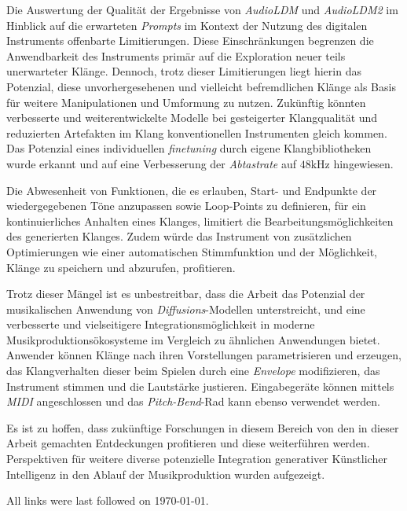 \documentclass[
  a4paper,  %
  twoside,  %
  bibliography=totoc,
  headsepline,
  cleardoublepage=empty,
  parskip=half,
  draft=false
]{scrbook}
\begin{document}
Die Auswertung der Qualität der Ergebnisse von \emph{AudioLDM} \cite{liu_audioldm_2023} und \emph{AudioLDM2} \cite{liu_audioldm2_2023} im Hinblick auf die erwarteten \emph{Prompts} im Kontext der Nutzung des digitalen Instruments offenbarte Limitierungen. Diese Einschränkungen begrenzen die Anwendbarkeit des Instruments primär auf die Exploration neuer teils unerwarteter Klänge. Dennoch, trotz dieser Limitierungen liegt hierin das Potenzial, diese unvorhergesehenen und vielleicht befremdlichen Klänge als Basis für weitere Manipulationen und Umformung zu nutzen. Zukünftig könnten verbesserte und weiterentwickelte Modelle bei gesteigerter Klangqualität und reduzierten Artefakten im Klang konventionellen Instrumenten gleich kommen. Das Potenzial eines individuellen \emph{finetuning} durch eigene Klangbibliotheken wurde erkannt und auf eine Verbesserung der \emph{Abtastrate} auf $48$kHz hingewiesen. 

Die Abwesenheit von Funktionen, die es erlauben, Start- und Endpunkte der wiedergegebenen Töne anzupassen sowie Loop-Points zu definieren, für ein kontinuierliches Anhalten eines Klanges, limitiert die Bearbeitungsmöglichkeiten des generierten Klanges. Zudem würde das Instrument von zusätzlichen Optimierungen wie einer automatischen Stimmfunktion und der Möglichkeit, Klänge zu speichern und abzurufen, profitieren.

Trotz dieser Mängel ist es unbestreitbar, dass die Arbeit das Potenzial der musikalischen Anwendung von \emph{Diffusions}-Modellen unterstreicht, und eine verbesserte und vielseitigere Integrationsmöglichkeit in moderne Musikproduktionsökosysteme im Vergleich zu ähnlichen Anwendungen bietet. Anwender können Klänge nach ihren Vorstellungen parametrisieren und erzeugen, das Klangverhalten dieser beim Spielen durch eine \emph{Envelope} modifizieren, das Instrument stimmen und die Lautstärke justieren. Eingabegeräte können mittels \emph{MIDI} angeschlossen und das \emph{Pitch-Bend}-Rad kann ebenso verwendet werden.

Es ist zu hoffen, dass zukünftige Forschungen in diesem Bereich von den in dieser Arbeit gemachten Entdeckungen profitieren und diese weiterführen werden. Perspektiven für weitere diverse potenzielle Integration generativer Künstlicher Intelligenz in den Ablauf der Musikproduktion wurden aufgezeigt. 

\label{sec:conclusion}


\printbibliography

All links were last followed on \today{}.
\end{document}
